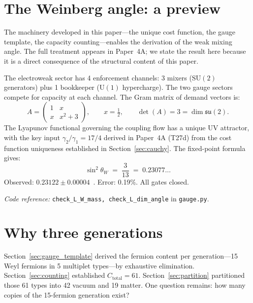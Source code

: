 \documentclass[11pt]{article}
\newcommand{\coderef}[2]{\smallskip\noindent\textit{Code reference:} \texttt{#1} in \texttt{#2}.}
\newcommand{\SU}{\mathrm{SU}}
\newcommand{\U}{\mathrm{U}}
\begin{document}
\section{The Weinberg angle: a preview}
\label{sec:weinberg}

The machinery developed in this paper---the unique cost function, the gauge template, the capacity counting---enables the derivation of the weak mixing angle.  The full treatment appears in Paper~4A; we state the result here because it is a direct consequence of the structural content of this paper.

The electroweak sector has 4 enforcement channels: 3 mixers ($\SU(2)$ generators) plus 1 bookkeeper ($\U(1)$ hypercharge).  The two gauge sectors compete for capacity at each channel.  The Gram matrix of demand vectors is:
\begin{equation}
A = \begin{pmatrix} 1 & x \\ x & x^2 + 3 \end{pmatrix}, \qquad x = \tfrac{1}{2}, \qquad \det(A) = 3 = \dim\mathfrak{su}(2).
\label{eq:weinberg_matrix}
\end{equation}
The Lyapunov functional governing the coupling flow has a unique UV attractor, with the key input $\gamma_2/\gamma_1 = 17/4$ derived in Paper~4A (T27d) from the cost function uniqueness established in Section~\ref{sec:cauchy}.  The fixed-point formula gives:
\begin{equation}
\sin^2\!\theta_W \;=\; \frac{3}{13} \;=\; 0.23077\ldots
\label{eq:weinberg_value}
\end{equation}
Observed: $0.23122 \pm 0.00004$~\cite{PDG2024}.  Error: 0.19\%.  All gates closed.

\coderef{check\_L\_W\_mass, check\_L\_dim\_angle}{gauge.py}


\section{Why three generations}
\label{sec:generations}

Section~\ref{sec:gauge_template} derived the fermion content per generation---15 Weyl fermions in 5 multiplet types---by exhaustive elimination.  Section~\ref{sec:counting} established $C_{\mathrm{total}} = 61$.  Section~\ref{sec:partition} partitioned those 61 types into 42 vacuum and 19 matter.  One question remains: how many copies of the 15-fermion generation exist?
\end{document}
